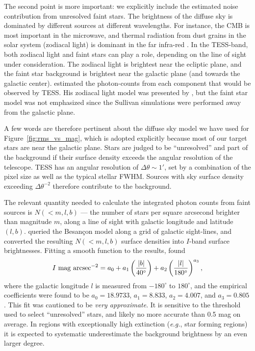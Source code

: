 \documentclass[12pt,twocolumn,tighten]{aastex62}
\begin{document}
The second point is more important: we explicitly include the
estimated noise contribution from unresolved faint stars.  The
brightness of the diffuse sky is dominated by different sources at
different wavelengths.  For instance, the CMB is most important in
the microwave, and thermal radiation from dust grains in the solar
system (zodiacal light) is dominant in the far infra-red
\citep{leinert_1997_1998}.  In the TESS-band, both zodiacal light and
faint stars can play a role, depending on the line of sight under
consideration. The zodiacal light is brightest near the ecliptic
plane, and the faint star background is brightest near the galactic
plane (and towards the galactic center).  \citet{winn_background_2013}
estimated the photon-counts from each component that would be observed 
by TESS.
His zodiacal light model was presented by \citet{Sullivan_et_al_2015},
but the faint star model was not emphasized since the Sullivan
simulations were performed away from the galactic plane.

A few words are therefore pertinent about the diffuse sky model we
have used for Figure~\ref{fig:rms_vs_mag}, which is adopted explicitly
because most of our target stars are near the galactic plane.
Stars are judged to be ``unresolved'' and part of the background if
their surface density exceeds the angular resolution of the telescope.
TESS has an angular resolution of $\Delta \theta \sim 1'$, set by a
combination of the pixel size as well as the typical stellar FWHM.
Sources with sky surface density exceeding $\Delta \theta^{-2}$
therefore contribute to the background.

The relevant quantity needed to calculate the integrated 
photon counts from faint sources
is  $N(<m,l,b)$ --- the number of stars per square arcsecond
brighter than magnitude $m$, along a line of sight with galactic
longitude and latitude $(l,b)$.
\citet{winn_background_2013} queried the Besan\c con model 
\citep{robin_synthetic_2003}  along a grid of galactic sight-lines, and 
converted the resulting $N(<m,l,b)$ surface densities into $I$-band surface 
brightnesses.
Fitting a smooth function to the results, \citet{winn_background_2013} found
\begin{equation}
I\ {\rm mag\ arcsec}^{-2} =
    a_0 + a_1 \left(\frac{|b|}{40^\circ}\right)
    + a_2 \left(\frac{|l|}{180^\circ}\right)^{a_3},
\end{equation}
where the galactic longitude $l$ is measured from $-180^\circ$ to 
$180^\circ$, and the empirical coefficients were found to be $a_0 = 18.9733$, 
$a_1=8.833$, $a_2=4.007$, and $a_3=0.805$.
This fit was cautioned to be {\it very approximate}.
It is sensitive to the threshold used to select ``unresolved'' stars, and 
likely no more accurate than 0.5 mag on average.
In regions with exceptionally high extinction ({\it e.g.}, star forming 
regions) it is expected to systematic underestimate the background brightness 
by an even larger degree.
\end{document}
